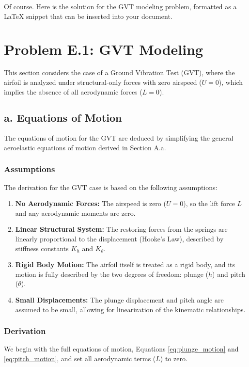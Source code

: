 \documentclass{article}
\begin{document}
Of course. Here is the solution for the GVT modeling problem, formatted as a LaTeX snippet that can be inserted into your document.


\newpage
\section{Problem E.1: GVT Modeling}
This section considers the case of a Ground Vibration Test (GVT), where the airfoil is analyzed under structural-only forces with zero airspeed ($U=0$), which implies the absence of all aerodynamic forces ($L=0$).

\subsection{a. Equations of Motion}
The equations of motion for the GVT are deduced by simplifying the general aeroelastic equations of motion derived in Section A.a.

\subsubsection{Assumptions}
The derivation for the GVT case is based on the following assumptions:
\begin{enumerate}
    \item \textbf{No Aerodynamic Forces:} The airspeed is zero ($U=0$), so the lift force $L$ and any aerodynamic moments are zero.
    \item \textbf{Linear Structural System:} The restoring forces from the springs are linearly proportional to the displacement (Hooke's Law), described by stiffness constants $K_h$ and $K_\theta$.
    \item \textbf{Rigid Body Motion:} The airfoil itself is treated as a rigid body, and its motion is fully described by the two degrees of freedom: plunge ($h$) and pitch ($\theta$).
    \item \textbf{Small Displacements:} The plunge displacement and pitch angle are assumed to be small, allowing for linearization of the kinematic relationships.
\end{enumerate}

\subsubsection{Derivation}
We begin with the full equations of motion, Equations \eqref{eq:plunge_motion} and \eqref{eq:pitch_motion}, and set all aerodynamic terms ($L$) to zero.
\end{document}
